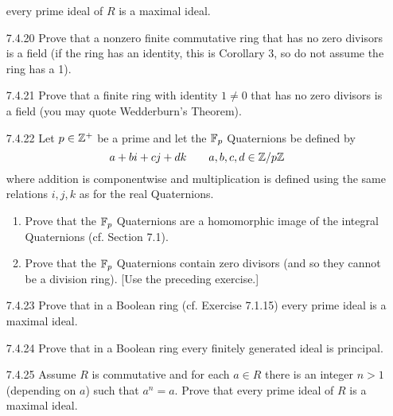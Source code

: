 \begin{enumerate}
                  every prime ideal of $R$ is a maximal ideal.
   \item[7.4.20]  Prove that a nonzero finite commutative ring that has no zero
                  divisors is a field (if the ring has an identity, this is
                  Corollary 3, so do not assume the ring has a 1).
   \item[7.4.21]  Prove that a finite ring with identity $1 \neq 0$ that has no
                  zero divisors is a field (you may quote Wedderburn's Theorem).
   \item[7.4.22]  Let $p \in \mathbb{Z}^+$ be a prime and let the $\mathbb{F}_p$ Quaternions be
                  defined by
                  $$a + bi + cj + dk \qquad a, b, c, d \in \mathbb{Z}/p\mathbb{Z}$$
                  where addition is componentwise and multiplication is defined
                  using the same relations $i, j, k$ as for the real
                  Quaternions.
                  \begin{enumerate}
                     \item Prove that the $\mathbb{F}_p$ Quaternions are a homomorphic
                           image of the integral Quaternions (cf. Section 7.1).
                     \item Prove that the $\mathbb{F}_p$ Quaternions contain zero
                           divisors (and so they cannot be a division ring).
                           [Use the preceding exercise.]
                  \end{enumerate}
   \item[7.4.23]  Prove that in a Boolean ring (cf. Exercise 7.1.15) every prime
                  ideal is a maximal ideal.
   \item[7.4.24]  Prove that in a Boolean ring every finitely generated ideal is
                  principal.
   \item[7.4.25]  Assume $R$ is commutative and for each $a \in R$ there is an
                  integer $n > 1$ (depending on $a$) such that $a^n = a$. Prove
                  that every prime ideal of $R$ is a maximal ideal.

\end{enumerate}
